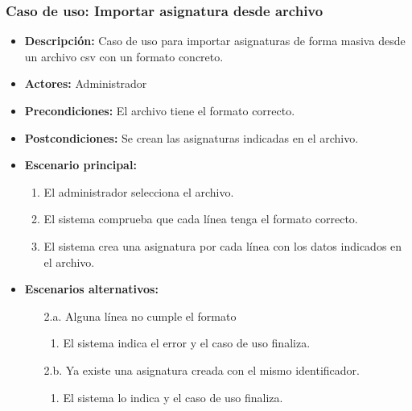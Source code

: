 \documentclass{book}
\begin{document}
\subsubsection*{Caso de uso: Importar asignatura desde archivo}
\begin{itemize}
\item{\bf Descripción:} Caso de uso para importar asignaturas de forma masiva desde un archivo csv con un formato concreto.
\item{\bf Actores:} Administrador
\item{\bf Precondiciones:} El archivo tiene el formato correcto.
\item{\bf Postcondiciones:} Se crean las asignaturas indicadas en el archivo.
\item{\bf Escenario principal:}
	\begin{enumerate}
	\item El administrador selecciona el archivo.
	\item El sistema comprueba que cada línea tenga el formato correcto.
	\item El sistema crea una asignatura por cada línea con los datos indicados en el archivo.
	\end{enumerate}
\item{\bf Escenarios alternativos:}
	\begin{itemize}
		\item[2.a.] Alguna línea no cumple el formato
		\begin{enumerate}
			\item El sistema indica el error y el caso de uso finaliza.
		\end{enumerate}
		\item[2.b.] Ya existe una asignatura creada con el mismo identificador.
		\begin{enumerate}
			\item El sistema lo indica y el caso de uso finaliza.
		\end{enumerate}
	\end{itemize}
\end{itemize}
\end{document}
